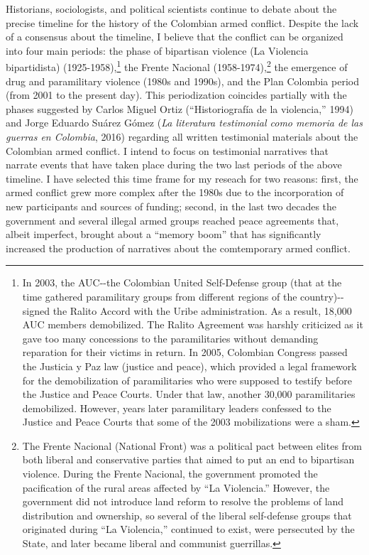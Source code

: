 \documentclass[
  11pt,
,
onecolumn,
openany
]{book}
\begin{document}
Historians, sociologists, and political scientists continue to debate about
the precise timeline for the history of the Colombian armed conflict. Despite
the lack of a consensus about the timeline, I believe that the conflict can be
organized into four main periods: the phase of bipartisan violence (La
Violencia bipartidista) (1925-1958),\footnote{In 2003, the AUC-\/-the
  Colombian United Self-Defense group (that at the time gathered paramilitary
  groups from different regions of the country)-\/- signed the Ralito Accord
  with the Uribe administration. As a result, 18,000 AUC members demobilized.
  The Ralito Agreement was harshly criticized as it gave too many concessions
  to the paramilitaries without demanding reparation for their victims in
  return. In 2005, Colombian Congress passed the Justicia y Paz law (justice
  and peace), which provided a legal framework for the demobilization of
  paramilitaries who were supposed to testify before the Justice and Peace
  Courts. Under that law, another 30,000 paramilitaries demobilized. However,
  years later paramilitary leaders confessed to the Justice and Peace Courts
  that some of the 2003 mobilizations were a sham.} the Frente Nacional
(1958-1974),\footnote{The Frente Nacional (National Front) was a political
  pact between elites from both liberal and conservative parties that aimed to
  put an end to bipartisan violence. During the Frente Nacional, the
  government promoted the pacification of the rural areas affected by ``La
  Violencia.'' However, the government did not introduce land reform to
  resolve the problems of land distribution and ownership, so several of the
  liberal self-defense groups that originated during ``La Violencia,''
  continued to exist, were persecuted by the State, and later became liberal
  and communist guerrillas.} the emergence of drug and paramilitary violence
(1980s and 1990s), and the Plan Colombia period (from 2001 to the present
day). This periodization coincides partially with the phases suggested by
Carlos Miguel Ortiz (``Historiografía de la violencia,'' 1994) and Jorge
Eduardo Suárez Gómez (\emph{La literatura testimonial como memoria de las
guerras en Colombia}, 2016) regarding all written testimonial materials about
the Colombian armed conflict. I intend to focus on testimonial narratives that
narrate events that have taken place during the two last periods of the above
timeline. I have selected this time frame for my reseach for two reasons:
first, the armed conflict grew more complex after the 1980s due to the
incorporation of new participants and sources of funding; second, in the last
two decades the government and several illegal armed groups reached peace
agreements that, albeit imperfect, brought about a ``memory boom'' that has
significantly increased the production of narratives about the comtemporary
armed conflict.
\end{document}
